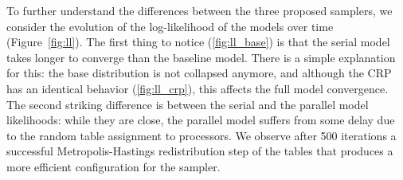 To further understand the differences between the three proposed samplers, we consider the evolution of the log-likelihood of the models over time (Figure~\ref{fig:ll}). The first thing to notice (\ref{fig:ll_base}) is that the serial model takes longer to converge than the baseline model. There is a simple explanation for this: the base distribution is not collapsed anymore, and although the CRP has an identical behavior (\ref{fig:ll_crp}), this affects the full model convergence. The second striking difference is between the serial and the parallel model likelihoods: while they are close, the parallel model suffers from some delay due to the random table assignment to processors. We observe after 500 iterations a successful Metropolis-Hastings redistribution step of the tables that produces a more efficient configuration for the sampler.

